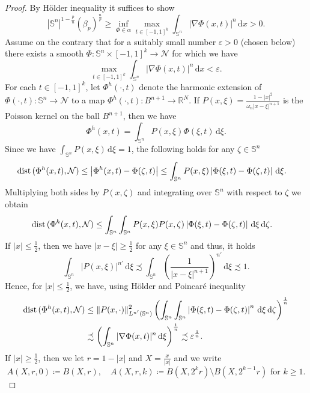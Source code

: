 \documentclass[12pt]{amsart}
\def\eps{\varepsilon}
\def\B{{B}}
\def\n{{\mathcal M}}
\newcommand{\dif}{\,\mathrm{d}}
\def\n{{\mathcal{M}}}
\def\n{{\mathcal N}}
\def\S{{\mathbb S}}
\def\dist{{\rm dist\,}}
\newcommand{\dx}{\dif x}
\newcommand{\R}{\mathbb{R}}
\newcommand{\brac}[1]{\left (#1 \right )}
\newcommand{\abs}[1]{\left |#1 \right |}
\numberwithin{theorem}{section} \numberwithin{equation}{section}
\newcommand{\aleq}{\precsim}
\begin{document}
\begin{proof}
By H\"older inequality it suffices to show
\[
 |\S^n|^{1-\frac{p}{n}} (\beta_p)^{\frac{n}{p}} \geq \inf_{\Phi \in \alpha} \max_{t \in [-1,1]^k} \int_{\S^n} |\nabla \Phi(x,t)|^n \dx > 0.
\]
Assume on the contrary that for a suitably small number $\eps > 0$ (chosen below) there exists a smooth $\Phi \colon \S^{n}\times[-1,1]^k \to \n$ for which we have
\begin{equation}\label{eq:smallness-contradiction}
 \max_{t \in [-1,1]^k} \int_{\S^n} |\nabla \Phi(x,t)|^n \dx < \eps.
\end{equation}
For each $t \in [-1,1]^k$, let $\Phi^h(\cdot,t)$ denote the harmonic extension of $\Phi(\cdot,t)\colon \S^n \to \n$  to a map $\Phi^h(\cdot,t)\colon \B^{n+1} \to \R^N$.
If $P(x,\xi) = \frac{1-|x|^2}{\omega_n |x-\xi|^{n+1}}$ is the Poisson kernel on the ball $B^{n+1}$, then we have 
\[
 \Phi^h(x,t) = \int_{\S^n} P(x,\xi) \Phi(\xi,t)\dif \xi.
\]
Since we have $\int_{\S^n}P(x,\xi)\dif \xi = 1$, the following holds for any $\zeta \in \S^n$
\[
\begin{split}
 \dist(\Phi^h(x,t),\n) &\le \abs{\Phi^h(x,t) - \Phi(\zeta,t)} \le \int_{\S^n} P(x,\xi) \abs{\Phi(\xi,t) - \Phi(\zeta,t)}\dif \xi.
\end{split}
 \]
Multiplying both sides by $P(x,\zeta)$ and integrating over $\S^n$ with respect to $\zeta$ we obtain
\begin{equation}\label{eq:distanceestimate}
 \begin{split}
  \dist(\Phi^h(x,t),\n) &\le \int_{\S^n}\int_{\S^n} P(x,\xi) P(x,\zeta) \abs{\Phi(\xi,t) - \Phi(\zeta,t)}\dif \xi \dif \zeta. 
 \end{split}
\end{equation}
If $|x|\le \frac12$, then we have $|x-\xi|\ge \frac12$ for any $\xi\in \S^n$ and thus, it holds
\[
 \int_{\S^n}|P(x,\xi)|^{n'}\dif \xi \aleq \int_{\S^n}\brac{\frac{1}{|x-\xi|^{n+1}}}^{n'} \dif \xi \aleq 1.
\]
Hence, for $|x|\le \frac12$, we have, using H\"{o}lder and Poincar\'{e} inequality
\[
\begin{split}
 \dist(\Phi^h(x,t),\n) 
 &\le \|P(x,\cdot)\|_{L^{n'}(\S^n)}^2 \brac{\int_{\S^n}\int_{\S^n} \abs{\Phi(\xi,t) - \Phi(\zeta,t)}^n\dif \xi \dif \zeta}^{\frac 1n}\\
 &\aleq \brac{\int_{\S^n}|\nabla \Phi(x,t)|^n \dif \xi}^{\frac 1n} \aleq \eps^{\frac 1n}.
\end{split}
 \]
If $|x|\ge \frac12$, then we let $r=1-|x|$ and $X=\frac{x}{|x|}$ and we write 
\[
A(X,r,0) \coloneqq B(X,r), \quad  A(X,r,k)\coloneqq B(X,2^{k}r)\setminus B(X,2^{k-1}r) \text{ for }k\ge 1.
\]
\end{proof}
\end{document}
